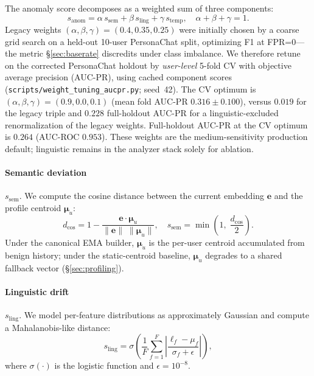 \documentclass[conference]{IEEEtran}
\newcommand{\seman}{s_{\mathrm{sem}}}
\newcommand{\ling}{s_{\mathrm{ling}}}
\newcommand{\temp}{s_{\mathrm{temp}}}
\newcommand{\anomaly}{s_{\mathrm{anom}}}
\newcommand{\eu}{\boldsymbol{\mu}_u}
\newcommand{\ew}{\mathbf{e}}
\begin{document}
The anomaly score decomposes as a weighted sum of three components:
\begin{equation}
  \label{eq:composite}
  \anomaly = \alpha\,\seman + \beta\,\ling + \gamma\,\temp,
  \quad \alpha + \beta + \gamma = 1.
\end{equation}
Legacy weights $(\alpha, \beta, \gamma) = (0.4, 0.35, 0.25)$ were initially chosen by
a coarse grid search on a held-out 10-user PersonaChat split, optimizing F1 at FPR=0---
the metric \S\ref{sec:baserate} discredits under class imbalance.
We therefore retune on the corrected PersonaChat holdout by \emph{user-level} 5-fold
CV with objective average precision (AUC-PR), using cached component scores
(\texttt{scripts/weight\_tuning\_aucpr.py}; seed~42).
The CV optimum is $(\alpha, \beta, \gamma) = (0.9, 0.0, 0.1)$ (mean fold AUC-PR
$0.316\pm0.100$), versus $0.019$ for the legacy triple and $0.228$ full-holdout
AUC-PR for a linguistic-excluded renormalization of the legacy weights.
Full-holdout AUC-PR at the CV optimum is $0.264$ (AUC-ROC $0.953$).
These weights are the medium-sensitivity production default; linguistic remains in
the analyzer stack solely for ablation.

\paragraph{Semantic deviation} $\seman$.
We compute the cosine distance between the current embedding $\ew$ and the profile
centroid $\eu$:
\begin{equation}
  d_{\cos} = 1 - \frac{\ew \cdot \eu}{\|\ew\|\;\|\eu\|},
  \quad
  \seman = \min\!\left(1,\; \frac{d_{\cos}}{2}\right).
\end{equation}
Under the canonical EMA builder, $\eu$ is the per-user centroid accumulated from benign
history; under the static-centroid baseline, $\eu$ degrades to a shared fallback vector
(\S\ref{sec:profiling}).

\paragraph{Linguistic drift} $\ling$.
We model per-feature distributions as approximately Gaussian and compute a
Mahalanobis-like distance:
\begin{equation}
  \ling = \sigma\!\left(\frac{1}{F}\sum_{f=1}^{F}
    \left|\frac{\ell_f - \mu_f}{\sigma_f + \epsilon}\right|
  \right),
\end{equation}
where $\sigma(\cdot)$ is the logistic function and $\epsilon{=}10^{-8}$.
\end{document}
